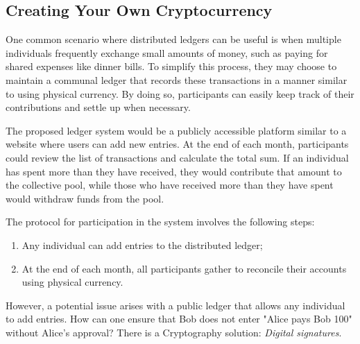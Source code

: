 \subsection{Creating Your Own Cryptocurrency}
One common scenario where distributed ledgers can be useful is when multiple individuals frequently exchange small amounts of money, such as
paying for shared expenses like dinner bills. To simplify this process, they may choose to maintain a communal ledger that records these
transactions in a manner similar to using physical currency. By doing so, participants can easily keep track of their contributions and settle
up when necessary.

%

The proposed ledger system would be a publicly accessible platform similar to a website where users can add new entries. At the end of each
month, participants could review the list of transactions and calculate the total sum. If an individual has spent more than they have received,
they would contribute that amount to the collective pool, while those who have received more than they have spent would withdraw funds from
the pool.

The protocol for participation in the system involves the following steps:

\begin{enumerate}
    \item Any individual can add entries to the distributed ledger;
    \item At the end of each month, all participants gather to reconcile their accounts using physical currency.
\end{enumerate}

However, a potential issue arises with a public ledger that allows any individual to add entries. How can one ensure that Bob does not enter
"Alice pays Bob 100" without Alice's approval? There is a Cryptography solution: \emph{Digital signatures}.
